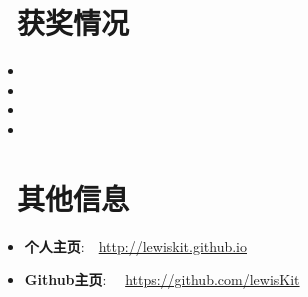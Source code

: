 \documentclass{resume}
\begin{document}

\section{\faHeartO\ 获奖情况}
\begin{itemize}
\item {}
\item {}
\item {}
\item {}
\end{itemize}

\section{\faPaperPlane\ 其他信息}
\begin{itemize}
\item \textbf{个人主页}:\ \  \url{http://lewiskit.github.io}
\item \textbf{Github主页}: \ \ \url{https://github.com/lewisKit}
\end{itemize}


%
%
\end{document}
